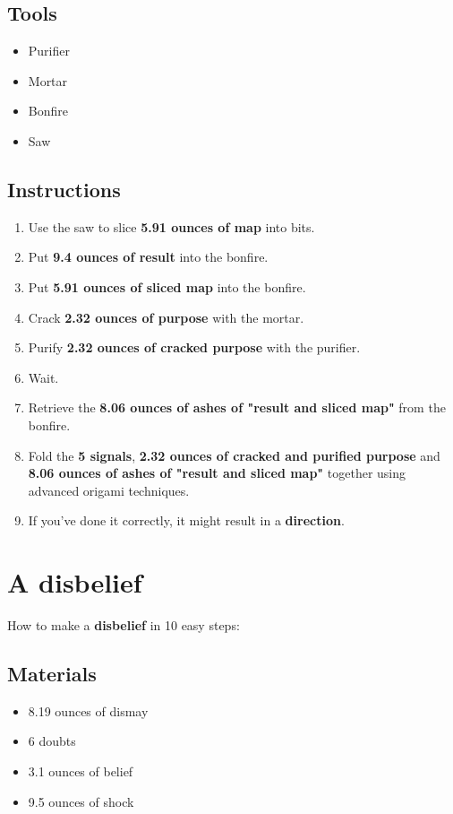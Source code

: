 \documentclass{article}
\begin{document}
\subsection{Tools}\begin{itemize}
\item 
Purifier
\item 
Mortar
\item 
Bonfire
\item 
Saw
\end{itemize}
\subsection{Instructions}\begin{enumerate}
\item 
Use the saw to slice \textbf{5.91 ounces of map} into bits.
\item 
Put \textbf{9.4 ounces of result} into the bonfire.
\item 
Put \textbf{5.91 ounces of sliced map} into the bonfire.
\item 
Crack \textbf{2.32 ounces of purpose} with the mortar.
\item 
Purify \textbf{2.32 ounces of cracked purpose} with the purifier.
\item 
Wait.
\item 
Retrieve the \textbf{8.06 ounces of ashes of "result and sliced map"} from the bonfire.
\item 
Fold the \textbf{5 signals}, \textbf{2.32 ounces of cracked and purified purpose} and \textbf{8.06 ounces of ashes of "result and sliced map"} together using advanced origami techniques.
\item 
If you've done it correctly, it might result in a \textbf{direction}.
\end{enumerate}
\newpage
\section{A disbelief}How to make a \textbf{disbelief} in 10 easy steps:

\subsection{Materials}\begin{itemize}
\item 
8.19 ounces of dismay
\item 
6 doubts
\item 
3.1 ounces of belief
\item 
9.5 ounces of shock
\end{itemize}
\end{document}
